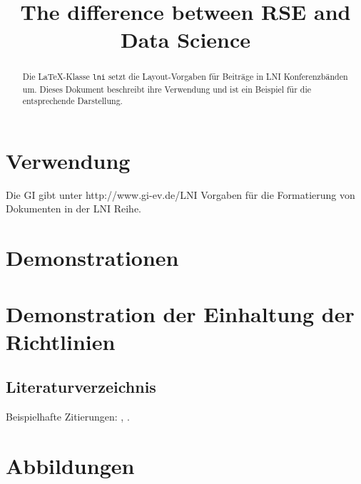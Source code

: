 \documentclass[
        english,biblatex
    ]{lni}
\begin{document}
        \title[]{The difference between RSE and Data Science}
    
    
    

    \maketitle

        \begin{abstract}
        Die LaTeX-Klasse \texttt{lni} setzt die Layout-Vorgaben für
        Beiträge in LNI Konferenzbänden um. Dieses Dokument beschreibt
        ihre Verwendung und ist ein Beispiel für die entsprechende
        Darstellung.
    \end{abstract}
    
    
    \section{Verwendung}\label{verwendung}

    Die GI gibt unter http://www.gi-ev.de/LNI Vorgaben für die
    Formatierung von Dokumenten in der LNI Reihe.

    \section{Demonstrationen}\label{demos}

    \section{Demonstration der Einhaltung der
    Richtlinien}\label{lniconformance}

    \subsection{Literaturverzeichnis}\label{literaturverzeichnis}

    Beispielhafte Zitierungen: \textcite{Ez10}, \textcite{AB00}.

    \section{Abbildungen}\label{abbildungen}
\end{document}
